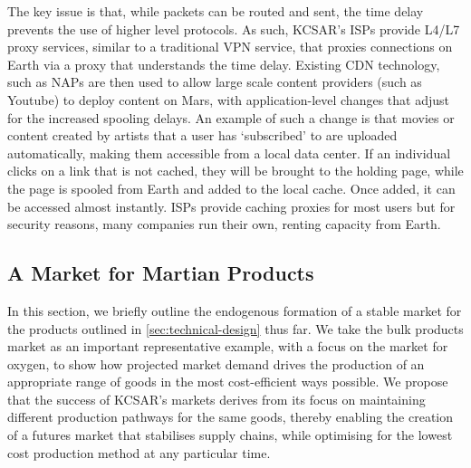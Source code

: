 \documentclass[fleqn,10pt]{Stylesheet} %
\begin{document}
The key issue is that, while packets can be routed and sent, the time delay prevents the use of higher level protocols. As such, KCSAR’s ISPs provide L4/L7 proxy services, similar to a traditional VPN service, that proxies connections on Earth via a proxy that understands the time delay. Existing CDN technology, such as NAPs are then used to allow large scale content providers (such as Youtube) to deploy content on Mars, with application-level changes that adjust for the increased spooling delays. An example of such a change is that movies or content created by artists that a user has ‘subscribed’ to are uploaded automatically, making them accessible from a local data center. If an individual clicks on a link that is not cached, they will be brought to the holding page, while the page is spooled from Earth and added to the local cache. Once added, it can be accessed almost instantly. ISPs provide caching proxies for most users but for security reasons, many companies run their own, renting capacity from Earth.


\subsection{A Market for Martian Products}
In this section, we briefly outline the endogenous formation of a stable market for the products outlined in \ref{sec:technical-design} thus far. We take the bulk products market as an important representative example, with a focus on the market for oxygen, to show how projected market demand drives the production of an appropriate range of goods in the most cost-efficient ways possible. We propose that the success of KCSAR's markets derives from its focus on maintaining different production pathways for the same goods, thereby enabling the creation of a futures market that stabilises supply chains, while optimising for the lowest cost production method at any particular time. 
\end{document}
